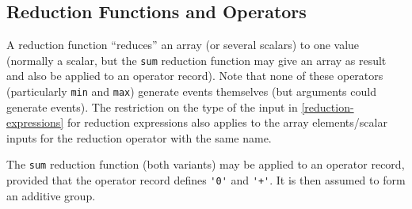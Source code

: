 \subsection{Reduction Functions and Operators}

A reduction function ``reduces'' an array (or several scalars) to one value (normally a scalar, but the \lstinline!sum! reduction function may give an array as result
and also be applied to an operator record).  Note that none of these operators (particularly \lstinline!min! and \lstinline!max!) generate events themselves (but arguments
could generate events).  The restriction on the type of the input in \autoref{reduction-expressions} for reduction expressions also applies to the array elements/scalar
inputs for the reduction operator with the same name.

The \lstinline!sum! reduction function (both variants) may be applied to an operator record, provided that the operator record defines \lstinline!'0'! and \lstinline!'+'!.
It is then assumed to form an additive group.

